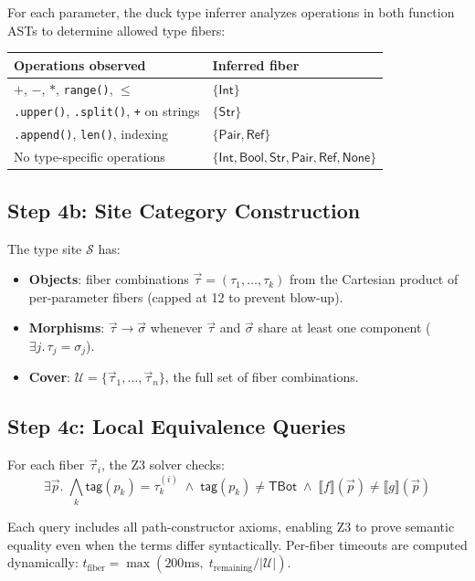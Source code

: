 \documentclass[11pt,a4paper]{report}
\theoremstyle{definition}
\theoremstyle{plain}
\newcommand{\den}[1]{\llbracket #1 \rrbracket}
\newcommand{\covers}{\mathcal{U}}
\newcommand{\site}{\mathcal{S}}
\begin{document}
For each parameter, the duck type inferrer analyzes operations in
both function ASTs to determine allowed type fibers:
\begin{center}
\small
\begin{tabular}{l l}
  \textbf{Operations observed} & \textbf{Inferred fiber} \\
  \hline
  $+$, $-$, $*$, \texttt{range()}, $\leq$ & $\{\mathsf{Int}\}$ \\
  \texttt{.upper()}, \texttt{.split()}, \texttt{+} on strings &
    $\{\mathsf{Str}\}$ \\
  \texttt{.append()}, \texttt{len()}, indexing &
    $\{\mathsf{Pair}, \mathsf{Ref}\}$ \\
  No type-specific operations &
    $\{\mathsf{Int}, \mathsf{Bool}, \mathsf{Str},
    \mathsf{Pair}, \mathsf{Ref}, \mathsf{None}\}$ \\
\end{tabular}
\end{center}

\subsection{Step 4b: Site Category Construction}

The type site $\site$ has:
\begin{itemize}
  \item \textbf{Objects}: fiber combinations
    $\vec{\tau} = (\tau_1, \ldots, \tau_k)$ from the Cartesian product
    of per-parameter fibers (capped at 12 to prevent blow-up).
  \item \textbf{Morphisms}: $\vec{\tau} \to \vec{\sigma}$ whenever
    $\vec{\tau}$ and $\vec{\sigma}$ share at least one component
    ($\exists j.\, \tau_j = \sigma_j$).
  \item \textbf{Cover}: $\covers = \{\vec{\tau}_1, \ldots,
    \vec{\tau}_n\}$, the full set of fiber combinations.
\end{itemize}

\subsection{Step 4c: Local Equivalence Queries}

For each fiber $\vec{\tau}_i$, the Z3 solver checks:
\[
  \exists \vec{p}.\; \bigwedge_k \mathsf{tag}(p_k) = \tau_k^{(i)}
  \;\land\; \mathsf{tag}(p_k) \neq \mathsf{TBot}
  \;\land\; \den{f}(\vec{p}) \neq \den{g}(\vec{p})
\]

Each query includes all path-constructor axioms, enabling Z3 to
prove semantic equality even when the terms differ syntactically.
Per-fiber timeouts are computed dynamically:
$t_{\text{fiber}} = \max(200\text{ms},\;
t_{\text{remaining}} / |\covers|)$.
\end{document}

